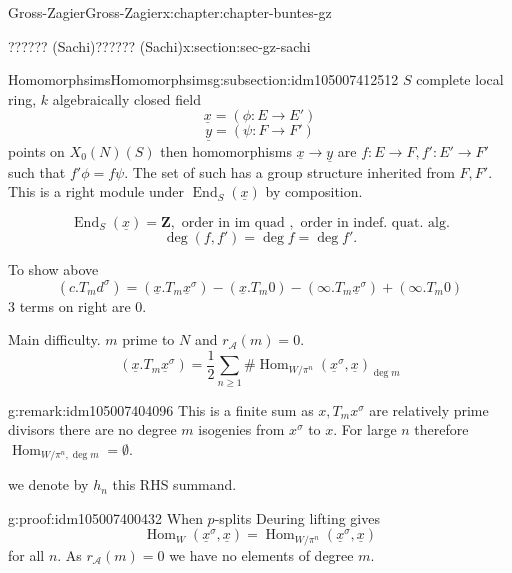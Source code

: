 \documentclass[oneside,10pt,]{book}
\numberwithin{equation}{section}
\newcommand{\ZZ}{\mathbf{Z}}
\DeclareMathOperator{\End}{End}
\DeclareMathOperator{\Hom}{Hom}
\begin{document}
\begin{chapterptx}{Gross-Zagier}{}{Gross-Zagier}{}{}{x:chapter:chapter-buntes-gz}
\begin{sectionptx}{?????? (Sachi)}{}{?????? (Sachi)}{}{}{x:section:sec-gz-sachi}
\begin{subsectionptx}{Homomorphsims}{}{Homomorphsims}{}{}{g:subsection:idm105007412512}
\(S\) complete local ring, \(k\) algebraically closed field%
\begin{equation*}
\underline x = (\phi  \colon E \to E')
\end{equation*}
%
\begin{equation*}
\underline y = (\psi  \colon F \to F')
\end{equation*}
points on \(X_0(N)(S)\) then homomorphisms \(\underline x \to \underline y\) are \(f\colon E\to F, f'\colon E'\to F'\) such that \(f' \phi = f \psi\). The set of such has a group structure inherited from \(F,F'\). This is a right module under \(\End_S(\underline x)\) by composition.%
\par
%
\begin{equation*}
\End_S(\underline x) = \ZZ, \text{ order in im quad }, \text{ order in indef. quat. alg.}
\end{equation*}
%
\begin{equation*}
\deg(f,f') = \deg f = \deg f'\text{.}
\end{equation*}
%
\par
To show above%
\begin{equation*}
(c.T_m d^\sigma ) = (\underline x. T_m \underline x^\sigma ) - (\underline x . T_m 0) - (\infty .T_m \underline x^\sigma ) + (\infty .T_m 0)
\end{equation*}
3 terms on right are 0.%
\par
Main difficulty. \(m\) prime to \(N\) and \(r_{\mathcal A} (m) = 0\).%
\begin{equation*}
(\underline x. T_m \underline x ^\sigma ) = \frac 12 \sum_{n\ge 1} \# \Hom _{W/\pi ^n}(\underline x ^\sigma , \underline x)_{\deg m}
\end{equation*}
%
\begin{remark}{}{g:remark:idm105007404096}%
This is a finite sum as \(x, T_mx^\sigma \) are relatively prime divisors there are no degree \(m\) isogenies from \(x^\sigma \) to \(x\). For large \(n\) therefore \(\Hom_{W/\pi ^n,\deg m} = \emptyset\).%
\end{remark}
we denote by \(h_n\) this RHS summand.%
\begin{proofptx}{}{g:proof:idm105007400432}
When \(p\)-splits Deuring lifting gives%
\begin{equation*}
\Hom_W (\underline x^\sigma ,\underline x) = \Hom_{W/\pi ^n}(\underline x^\sigma , \underline x)
\end{equation*}
for all \(n\). As \(r_{\mathcal A}(m)= 0\) we have no elements of degree \(m\).%
\par

\end{proofptx}
\end{subsectionptx}
\end{sectionptx}
\end{chapterptx}
\end{document}
